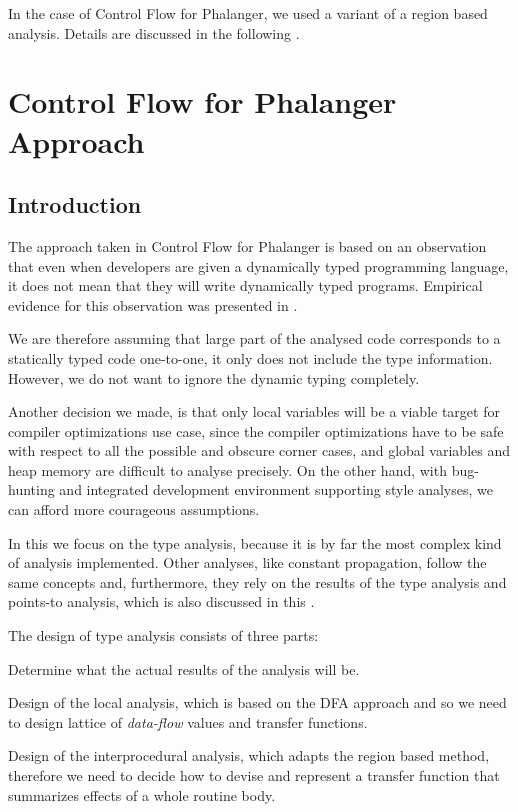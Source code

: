         In the case of Control Flow for Phalanger, we used 
        a variant of a region based analysis. Details are 
        discussed in the following \wsection{}.
    
    \section{Control Flow for Phalanger Approach}
    \label{phalapproach}
        
        \subsection{Introduction}
        The approach taken in Control Flow for Phalanger is based on an 
        observation that even when developers are given a dynamically typed 
        programming language, it does not mean that they will write 
        dynamically typed programs. Empirical evidence for this 
        observation was presented in \cite{walker1996type}. 
        
        We are therefore assuming that large part of the analysed 
        code corresponds to a statically typed code one-to-one, 
        it only does not include the type information. However, 
        we do not want to ignore the dynamic typing completely.

        Another decision we made, is that only local variables 
        will be a viable target for compiler optimizations use 
        case, since the compiler optimizations have to be safe with 
        respect to all the possible and obscure corner cases, 
        and global variables and heap memory are difficult to 
        analyse precisely. On the other hand, with bug-hunting and 
        integrated development environment supporting style 
        analyses, we can afford more courageous assumptions.
        
        In this \wsection{} we focus on the type analysis, because 
        it is by far the most complex kind of analysis implemented. 
        Other analyses, like constant propagation, follow the same 
        concepts and, furthermore, they rely on the results of the 
        type analysis and points-to analysis, which is 
        also discussed in this \wsection{}.
        
        The design of type analysis consists of three parts: 
        \begin{itemize*}
            \item Determine what the actual results of the analysis will be.
            \item Design of the local analysis, which is based on 
                the DFA approach and so we need to design lattice 
                of \emph{data-flow} values and transfer functions.
            \item Design of the interprocedural analysis, which 
                adapts the region based method, therefore we 
                need to decide how to devise and represent 
                a transfer function that summarizes effects of                 
                a whole routine body.
        \end{itemize*}
        

